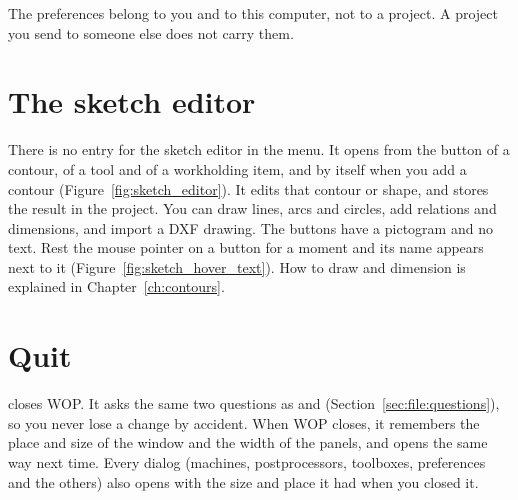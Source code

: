 The preferences belong to you and to this computer, not to a project. A project you send to someone else does not carry them.

\section{The sketch editor}
There is no entry for the sketch editor in the  menu. It opens from the button  of a contour, of a tool and of a workholding item, and by itself when you add a contour (Figure~\ref{fig:sketch_editor}). It edits that contour or shape, and  stores the result in the project. You can draw lines, arcs and circles, add relations and dimensions, and import a DXF drawing. The buttons have a pictogram and no text. Rest the mouse pointer on a button for a moment and its name appears next to it (Figure~\ref{fig:sketch_hover_text}). How to draw and dimension is explained in Chapter~\ref{ch:contours}.


\section{Quit}
 closes WOP. It asks the same two questions as  and  (Section~\ref{sec:file:questions}), so you never lose a change by accident. When WOP closes, it remembers the place and size of the window and the width of the panels, and opens the same way next time. Every dialog (machines, postprocessors, toolboxes, preferences and the others) also opens with the size and place it had when you closed it.
